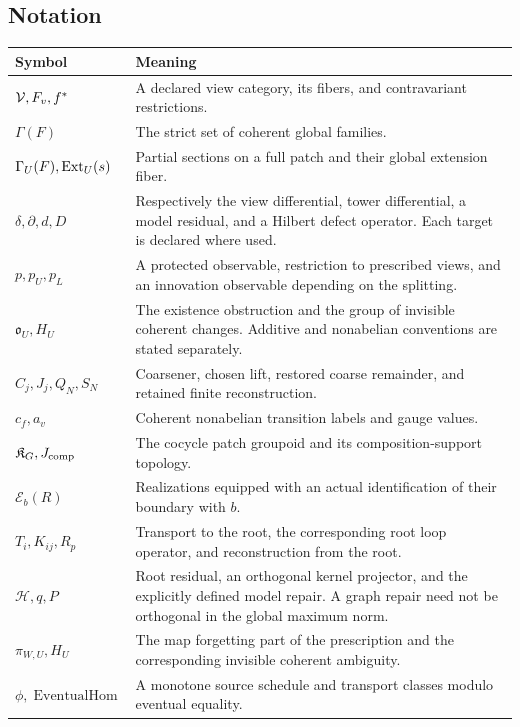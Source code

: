 \label{app:concordance}
\subsection{Notation}
\begin{longtable}{@{}p{.25\linewidth}p{.7\linewidth}@{}}
\toprule
Symbol & Meaning\\\midrule\endhead
\(\mathcal V,F_v,f^*\) & A declared view category, its fibers, and contravariant restrictions.\\
\(\Gamma(F)\) & The strict set of coherent global families.\\
\(\Gamma_U(F),\operatorname{Ext}_U(s)\) & Partial sections on a full patch and their global extension fiber.\\
\(\delta,\partial,d,D\) & Respectively the view differential, tower differential, a model residual, and a Hilbert defect operator. Each target is declared where used.\\
\(p,p_U,p_L\) & A protected observable, restriction to prescribed views, and an innovation observable depending on the splitting.\\
\(\mathfrak o_U,H_U\) & The existence obstruction and the group of invisible coherent changes. Additive and nonabelian conventions are stated separately.\\
\(C_j,J_j,Q_N,S_N\) & Coarsener, chosen lift, restored coarse remainder, and retained finite reconstruction.\\
\(c_f,a_v\) & Coherent nonabelian transition labels and gauge values.\\
\(\mathfrak K_G,J_{\rm comp}\) & The cocycle patch groupoid and its composition-support topology.\\
\(\mathcal E_b(R)\) & Realizations equipped with an actual identification of their boundary with \(b\).\\
\(T_i,K_{ij},R_p\) & Transport to the root, the corresponding root loop operator, and reconstruction from the root.\\
\(\mathcal H,q,P\) & Root residual, an orthogonal kernel projector, and the explicitly defined model repair. A graph repair need not be orthogonal in the global maximum norm.\\
\(\pi_{W,U},H_U\) & The map forgetting part of the prescription and the corresponding invisible coherent ambiguity.\\
\(\phi,\operatorname{EventualHom}\) & A monotone source schedule and transport classes modulo eventual equality.\\

\end{longtable}

